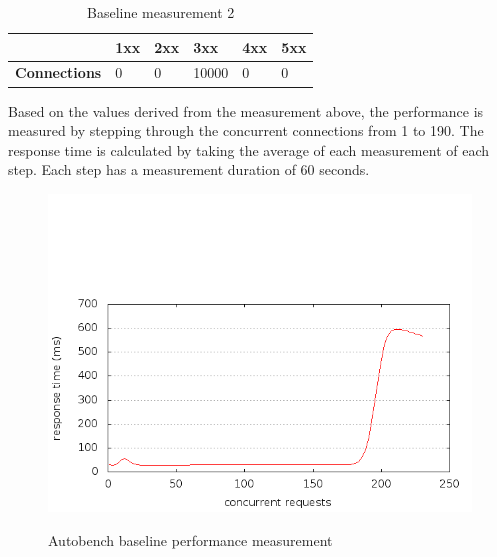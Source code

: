 \documentclass[Measurements]{subfiles}
\begin{document}
\begin{table}[h]
\caption{Baseline measurement 2}
\begin{tabular}{|p{2cm}|p{}|p{}|p{}|p{}|p{}|}
\hline
 & \textbf{1xx} & \textbf{2xx} & \textbf{3xx} & \textbf{4xx} & \textbf{5xx} \\ \hline
\textbf{Connections} & 0 & 0 & 10000 & 0 & 0 \\ \hline
\end{tabular}
\label{fig:Baseline measurement 2}
\end{table}

Based on the values derived from the measurement above, the performance is measured by stepping through the concurrent connections from 1 to 190. The response time is calculated by taking the average of each measurement of  each step. Each step has a measurement duration of 60 seconds. 

\begin{figure}[H]
\caption{Autobench baseline performance measurement}
\centering
\includegraphics[scale=0.55] {images/results/baseline/output.png}
\label{fig:Baseline performance measurement}
\end{figure}
\end{document}
